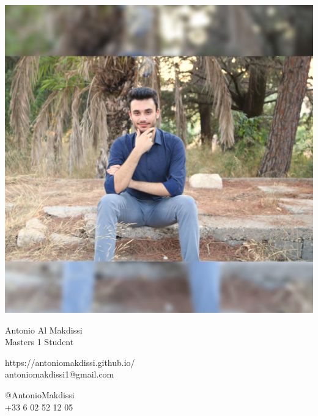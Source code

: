 \documentclass{article}
\begin{document}
\centering \includegraphics[width=.25\linewidth]{profile_pic.jpeg}\\[5pt]
\parbox{2in}{\Large \centering Antonio Al Makdissi\\[1pt]
\normalsize Masters 1 Student}

\vfill
\raggedright
\begin{multicols}{2}
https://antoniomakdissi.github.io/\\
antoniomakdissi1@gmail.com

\columnbreak
\raggedleft
@AntonioMakdissi\\
+33 6 02 52 12 05%
\end{multicols}%
\end{document}

